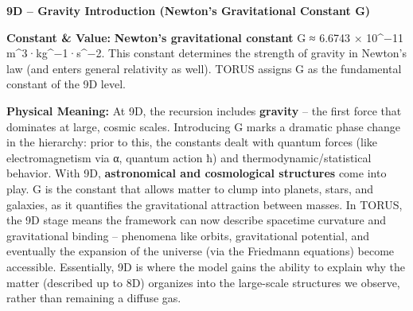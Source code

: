 \documentclass[
]{article}
\begin{document}
\textbf{9D -- Gravity Introduction (Newton's Gravitational Constant G)}

\textbf{Constant \& Value:} \textbf{Newton's gravitational constant} G ≈
6.6743 × 10\^{}−11 m\^{}3·kg\^{}−1·s\^{}−2\hspace{0pt}. This constant
determines the strength of gravity in Newton's law (and enters general
relativity as well). TORUS assigns G as the fundamental constant of the
9D level.

\textbf{Physical Meaning:} At 9D, the recursion includes
\textbf{gravity} -- the first force that dominates at large, cosmic
scales. Introducing G marks a dramatic phase change in the hierarchy:
prior to this, the constants dealt with quantum forces (like
electromagnetism via α, quantum action ħ) and thermodynamic/statistical
behavior. With 9D, \textbf{astronomical and cosmological structures}
come into play\hspace{0pt}. G is the constant that allows matter to
clump into planets, stars, and galaxies, as it quantifies the
gravitational attraction between masses. In TORUS, the 9D stage means
the framework can now describe spacetime curvature and gravitational
binding -- phenomena like orbits, gravitational potential, and
eventually the expansion of the universe (via the Friedmann equations)
become accessible. Essentially, 9D is where the model gains the ability
to explain why the matter (described up to 8D) organizes into the
large-scale structures we observe, rather than remaining a diffuse gas.
\end{document}
